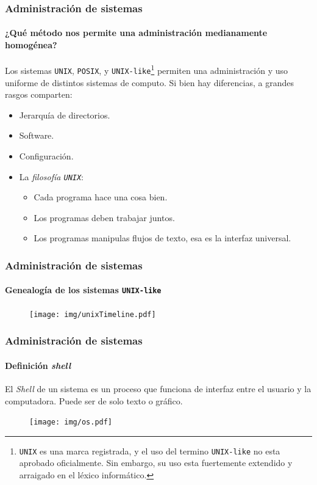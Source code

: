 \documentclass[11pt,a4paper,spanish]{beamer}
\begin{document}
\begin{frame}

    \frametitle{Administración de sistemas}
    \framesubtitle{¿Qué método nos permite una administración medianamente
    homogénea?}

    Los sistemas \texttt{UNIX}, \texttt{POSIX}, y
    \texttt{UNIX-like}\footnote{\texttt{UNIX} es una marca registrada, y el
    uso del termino \texttt{UNIX-like} no esta aprobado oficialmente. Sin
    embargo, su uso esta fuertemente extendido y arraigado en el léxico
    informático.} permiten una administración y uso uniforme de distintos
    sistemas de computo. Si bien hay diferencias, a grandes rasgos comparten:

\begin{itemize}
    \item Jerarquía de directorios.
    \item Software.
    \item Configuración.
    \item La \emph{filosofía \texttt{UNIX}}:
        \begin{itemize}
            \item Cada programa hace una cosa bien.
            \item Los programas deben trabajar juntos.
            \item Los programas manipulas flujos de texto, esa es la interfaz
                universal.
        \end{itemize}
\end{itemize}

\end{frame}

\begin{frame}
    \frametitle{Administración de sistemas}
    \framesubtitle{Genealogía de los sistemas \texttt{UNIX-like}}

    \begin{figure}
    \centering
    \texttt{[image: img/unixTimeline.pdf]}
        \captionsetup{textfont=tiny,labelformat=empty,justification=centering}
        \caption{\ccPublicDomain\cite{unixTimeline}}
    \end{figure}

\end{frame}

\begin{frame}

    \frametitle{Administración de sistemas}
    \framesubtitle{Definición \emph{shell}}

    El \emph{Shell} de un sistema es un proceso que funciona de interfaz
    entre el usuario y la computadora. Puede ser de solo texto o gráfico.

    \begin{figure}
    \centering
    \texttt{[image: img/os.pdf]}
        \captionsetup{textfont=tiny,labelformat=empty,justification=centering}
        \caption{}
    \end{figure}

\end{frame}
\end{document}
